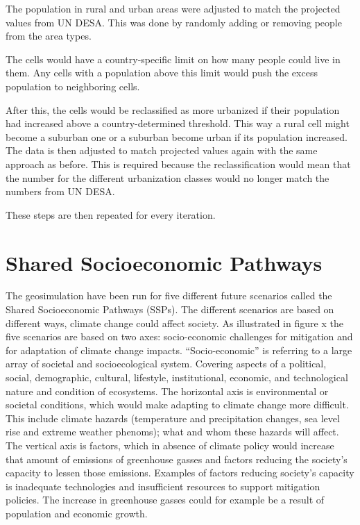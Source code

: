 The population in rural and urban areas were adjusted to match the projected values from UN DESA. This was done by randomly adding or removing people from the area types. 

The cells would have a country-specific limit on how many people could live in them. Any cells with a population above this limit would push the excess population to neighboring cells. 

After this, the cells would be reclassified as more urbanized if their population had increased above a country-determined threshold. This way a rural cell might become a suburban one or a suburban become urban if its population increased. The data is then adjusted to match projected values again with the same approach as before. This is required because the reclassification would mean that the number for the different urbanization classes would no longer match the numbers from UN DESA.

These steps are then repeated for every iteration. 


\section{Shared Socioeconomic Pathways}



The geosimulation have been run for five different future scenarios called the Shared Socioeconomic Pathways (SSPs). The different scenarios are based on different ways, climate change could affect society. As illustrated in figure x the five scenarios are based on two axes: socio-economic challenges for mitigation and for adaptation of climate change impacts. 
“Socio-economic” is referring to a large array of societal and socioecological system. Covering aspects of a political, social, demographic, cultural, lifestyle, institutional, economic, and technological nature and condition of ecosystems. 
The horizontal axis is environmental or societal conditions, which would make adapting to climate change more difficult. This include climate hazards (temperature and precipitation changes, sea level rise and extreme weather phenoms); what and whom these hazards will affect.
\citep{ConceptSSP}
The vertical axis is factors, which in absence of climate policy would increase that amount of emissions of greenhouse gasses and factors reducing the society’s capacity to lessen those emissions. Examples of factors reducing society’s capacity is inadequate technologies and insufficient resources to support mitigation policies. The increase in greenhouse gasses could for example be a result of population and economic growth.
\citep{SSP}

